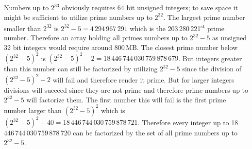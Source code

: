 \documentclass[a4paper,10pt]{article}
\begin{document}
Numbers up to $2^{33}$ obviously requires 64 bit unsigned integers;
to save space it might be sufficient to utilize prime numbers up to $2^{32}$.
The largest prime number smaller than $2^{32}$ is $2^{32} - 5 = 4\,294\,967\,291$
which is the 203\,280\,221\textsuperscript{st} prime number.
Therefore an array holding all primes numbers up to $2^{32} - 5$ as unsigned 32 bit integers would require around 800\,MB.
The closest prime number below $(2^{32} - 5)^2$ is $(2^{32} - 5)^2 - 2 = 18\,446\,744\,030\,759\,878\,679$.
But integers greater than this number can still be factorized by utilizing $2^{32} - 5$
since the division of $(2^{32} - 5)^2 - 2$ will fail
and therefore render it prime.
But for larger integers divisions will succeed
since they are not prime and therefore prime numbers up to $2^{32} - 5$ will factorize them.
The first number this will fail is the first prime number larger than $(2^{32} - 5)^2$
which is $(2^{32} - 5)^2 + 40 = 18\,446\,744\,030\,759\,878\,721$.
Therefore every integer up to 18\,446\,744\,030\,759\,878\,720 can be factorized by the set of all prime numbers up to $2^{32} - 5$.
\end{document}
